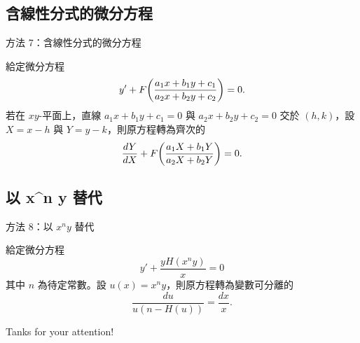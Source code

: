 \documentclass{beamer}
\newcommand{\Left} {\mathopen{}\mathclose\bgroup\left}
\newcommand{\Right}{\aftergroup\egroup\right}
\theoremstyle{remark}
\begin{document}
\begin{CJK}{UTF8}{bsmi}
\subsection[含線性分式]{含線性分式的微分方程}
\begin{frame}{方法 7：含線性分式的微分方程}
  \begin{theorem}
    給定微分方程
    \[y' + F \Left( \frac{a_1 x + b_1 y + c_1}{a_2 x + b_2 y + c_2} \Right) = 0.\]
    若在 $xy$-平面上，直線 $a_1 x + b_1 y + c_1 = 0$ 與 $a_2 x + b_2 y + c_2 = 0$ 交於 $(h,k)$，設 $X = x-h$ 與
    $Y = y-k$，則原方程轉為齊次的
    \[\frac{dY}{dX} + F \Left( \frac{a_1 X + b_1 Y}{a_2 X + b_2 Y} \Right) = 0.\]
  \end{theorem}
\end{frame}

\subsection[以 $x^n y$ 替代]{以 x\textasciicircum n y 替代}
\begin{frame}{方法 8：以 $x^n y$ 替代}
  \begin{theorem}
    給定微分方程
    \[y' + \frac{y H(x^n y)}{x} = 0\]
    其中 $n$ 為待定常數。設 $u(x) = x^n y$，則原方程轉為變數可分離的
    \[\frac{du}{u \left( n - H(u) \right)} = \frac{dx}{x}.\]
  \end{theorem}
\end{frame}

\begin{frame}
  \begin{center}
    \huge Tanks for your attention!
  \end{center}
\end{frame}
\end{CJK}
\end{document}

